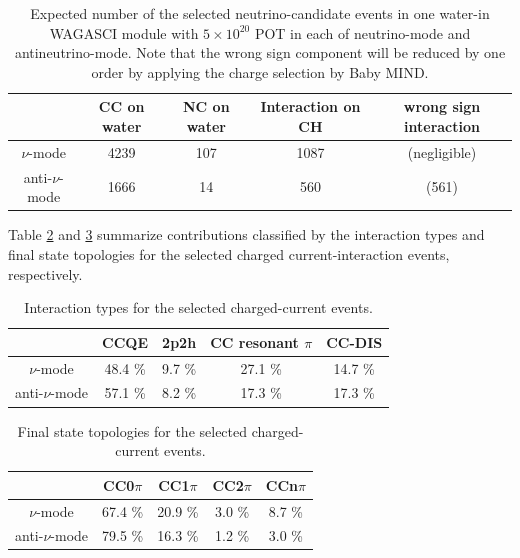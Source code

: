 \begin{table}[htbp]
  \begin{center}
    \caption{Expected number of the selected neutrino-candidate events in one water-in WAGASCI module with $5\times 10^{20}$ POT in each of neutrino-mode and antineutrino-mode.
      Note that the wrong sign component will be reduced by one order by applying the charge selection by Baby MIND.}
    \begin{tabular}{ccccc} \hline
   & CC on water & NC on water & Interaction on CH  & wrong sign interaction\\ \hline
   $\nu$-mode & 4239 & 107 & 1087 & (negligible) \\ \hline
   anti-$\nu$-mode & 1666 & 14 & 560 & (561) \\
\hline
    \end{tabular}
    \label{tab:expected_num_events}
  \end{center}
\end{table}


Table \ref{tab:expected_num_cc_events} and \ref{tab:expected_num_ccfsi_events} summarize
contributions classified by the interaction types and final state topologies for the selected charged current-interaction events, respectively.
%
\begin{table}[htbp]
  \begin{center}
    \caption{Interaction types for the selected charged-current events.}
    \begin{tabular}{c|cccc} \hline
& CCQE & 2p2h & CC resonant $\pi$  & CC-DIS \\ \hline
$\nu$-mode & 48.4 \% & 9.7 \% & 27.1 \% & 14.7 \% \\
anti-$\nu$-mode &  57.1 \% & 8.2 \% & 17.3 \% & 17.3 \% \\
\hline
    \end{tabular}
    \label{tab:expected_num_cc_events}
  \end{center}
\end{table}
%
\begin{table}[htbp]
  \begin{center}
    \caption{Final state topologies for the selected charged-current events.}
    \begin{tabular}{c|cccc} \hline
& CC0$\pi$ & CC1$\pi$ & CC2$\pi$ & CCn$\pi$ \\ \hline
      $\nu$-mode & 67.4 \% & 20.9 \% & 3.0 \% & 8.7 \% \\ \hline
      anti-$\nu$-mode & 79.5 \% & 16.3 \% & 1.2 \% & 3.0 \% \\\hline
    \end{tabular}
    \label{tab:expected_num_ccfsi_events}
  \end{center}
\end{table}

